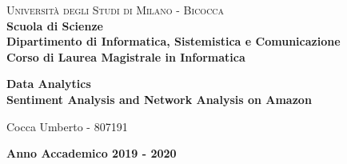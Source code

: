 \documentclass[a4paper,12pt]{article}
\renewcommand{\baselinestretch}{1.5}
\begin{document}
\begin{titlepage}
\noindent
    \vspace*{5mm}
	\begin{minipage}[t]{0.15\textwidth}
	    \vspace*{5mm}
	\end{minipage}
	\hspace{1cm}
	\begin{minipage}[t]{0.9\textwidth}
	      \vspace*{5mm}
		{
			{\textsc{Università degli Studi di Milano - Bicocca} } \\
			\textbf{Scuola di Scienze} \\
			\textbf{Dipartimento di Informatica, Sistemistica e Comunicazione} \\
			\textbf{Corso di Laurea Magistrale in Informatica} \\
			\par
		}
	\end{minipage}
	
	\vspace{42mm}

\begin{center}
    {\LARGE{
            \textbf{
            	Data Analytics \\ 
            	Sentiment Analysis and Network Analysis on Amazon}
    }}        
\end{center}

\vspace{40mm}
	
	
	\begin{flushright}
		\large{Cocca Umberto - 807191} 
	\end{flushright}
	
	\vspace{15mm}
	\begin{center}
		{\large{\bf Anno Accademico 2019 - 2020}}
	\end{center}


\renewcommand{\baselinestretch}{1.5}

\end{titlepage}
\end{document}
